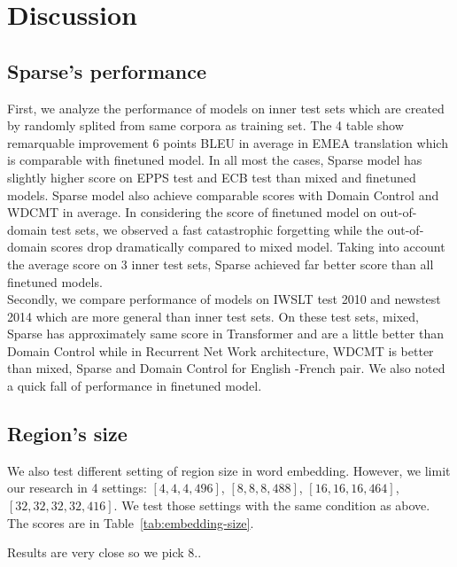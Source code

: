 \documentclass[11pt,a4paper]{article}
\newcommand{\fyTodo}[1]{\Todo[FY:]{\textcolor{orange}{#1}}}
\begin{document}
\section{Discussion\label{sec:Discussion}}
\subsection{Sparse's performance}
First, we analyze the performance of models on inner test sets which are created by randomly splited from same corpora as training set. The 4 table show remarquable improvement 6 points BLEU in average in EMEA translation which is comparable with finetuned model. In all most the cases, Sparse model has slightly higher score on EPPS test and ECB test than mixed and finetuned models. Sparse model also achieve comparable scores with Domain Control and WDCMT in average. In considering the score of finetuned model on out-of-domain test sets, we observed a fast catastrophic forgetting while the out-of-domain scores drop dramatically compared to mixed model. Taking into account the average score on 3 inner test sets, Sparse achieved far better score than all finetuned models. \\
Secondly, we compare performance of models on IWSLT test 2010 and newstest 2014 which are more general than inner test sets. On these test sets, mixed, Sparse has approximately same score in Transformer and are a little better than Domain Control while in Recurrent Net Work architecture, WDCMT is better than mixed, Sparse and Domain Control for English -French pair. We also noted a quick fall of performance in finetuned model.

\subsection{Region's size \label{secc:region_size}}

We also test different setting of region size in word embedding. However, we limit our research in 4 settings: $[4,4,4,496]$, $[8,8,8,488]$, $[16,16,16,464]$, $[32,32,32,32,416]$. We test those settings with the same condition as above. The scores are in Table~\ref{tab:embedding-size}.\fyTodo{Comment, homegenize captions.}

Results are very close so we pick 8.\fyTodo{Experiment with 64}. 
\end{document}
